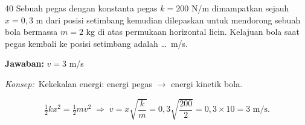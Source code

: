 \documentclass[11pt]{article}
\newcommand{\jawaban}[1]{%
  \noindent\colorbox{gold!30}{\parbox{\dimexpr\linewidth-2\fboxsep\relax}{%
    \textbf{Jawaban:} #1}}\par\smallskip}
\newcommand{\konsep}{\noindent\textit{Konsep:}\ \ignorespaces}
\begin{document}
\begin{soal}{40}  %
Sebuah pegas dengan konstanta pegas $k=200$ N/m dimampatkan sejauh
$x=0{,}3$ m dari posisi setimbang kemudian dilepaskan untuk
mendorong sebuah bola bermassa $m=2$ kg di atas permukaan horizontal
licin. Kelajuan bola saat pegas kembali ke posisi setimbang adalah
\ldots\ m/s.
\end{soal}
\begin{pembox}
\jawaban{$v = 3$ m/s}
\konsep Kekekalan energi: energi pegas $\to$ energi kinetik bola.

\[ \tfrac{1}{2}kx^2 = \tfrac{1}{2}mv^2 \;\Rightarrow\; v = x\sqrt{\frac{k}{m}} = 0{,}3\sqrt{\frac{200}{2}} = 0{,}3\times10 = 3 \text{ m/s}. \]
\end{pembox}
\end{document}
